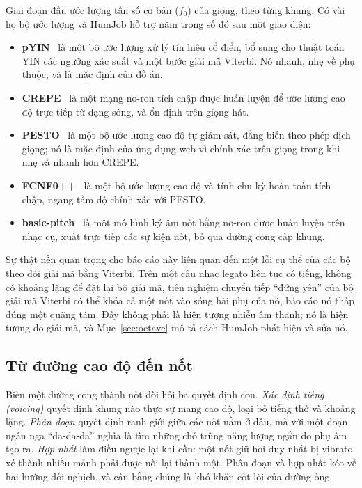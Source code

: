 \documentclass[12pt,a4paper]{article}
\begin{document}
Giai đoạn đầu ước lượng tần số cơ bản ($f_0$) của giọng, theo từng khung. Có vài họ
bộ ước lượng và HumJob hỗ trợ năm trong số đó sau một giao diện:

\begin{itemize}
    \item \textbf{pYIN}~\cite{pyin} là một bộ ước lượng xử lý tín hiệu cổ điển, bổ
    sung cho thuật toán YIN các ngưỡng xác suất và một bước giải mã Viterbi. Nó
    nhanh, nhẹ về phụ thuộc, và là mặc định của đồ án.
    \item \textbf{CREPE}~\cite{crepe} là một mạng nơ-ron tích chập được huấn luyện
    để ước lượng cao độ trực tiếp từ dạng sóng, và ổn định trên giọng hát.
    \item \textbf{PESTO}~\cite{pesto} là một bộ ước lượng cao độ tự giám sát, đẳng
    biến theo phép dịch giọng; nó là mặc định của ứng dụng web vì chính xác trên
    giọng trong khi nhẹ và nhanh hơn CREPE.
    \item \textbf{FCNF0++}~\cite{penn} là một bộ ước lượng cao độ và tính chu kỳ
    hoàn toàn tích chập, ngang tầm độ chính xác với PESTO.
    \item \textbf{basic-pitch}~\cite{basicpitch} là một mô hình ký âm nốt bằng
    nơ-ron được huấn luyện trên nhạc cụ, xuất trực tiếp các sự kiện nốt, bỏ qua
    đường cong cấp khung.
\end{itemize}

Sự thật nền quan trọng cho báo cáo này liên quan đến một lỗi cụ thể của các bộ theo
dõi giải mã bằng Viterbi. Trên một câu nhạc legato liên tục có tiếng, không có
khoảng lặng để đặt lại bộ giải mã, tiên nghiệm chuyển tiếp ``đứng yên'' của bộ giải
mã Viterbi có thể khóa cả một nốt vào sóng hài phụ của nó, báo cáo nó thấp đúng một
quãng tám. Đây không phải là hiện tượng nhiễu âm thanh; nó là hiện tượng do giải mã,
và Mục~\ref{sec:octave} mô tả cách HumJob phát hiện và sửa nó.

\subsection{Từ đường cao độ đến nốt}

Biến một đường cong thành nốt đòi hỏi ba quyết định con. \emph{Xác định tiếng
(voicing)} quyết định khung nào thực sự mang cao độ, loại bỏ tiếng thở và khoảng
lặng. \emph{Phân đoạn} quyết định ranh giới giữa các nốt nằm ở đâu, mà với một đoạn
ngân nga ``da-da-da'' nghĩa là tìm những chỗ trũng năng lượng ngắn do phụ âm tạo
ra. \emph{Hợp nhất} làm điều ngược lại khi cần: một nốt giữ hơi duy nhất bị vibrato
xé thành nhiều mảnh phải được nối lại thành một. Phân đoạn và hợp nhất kéo về hai
hướng đối nghịch, và cân bằng chúng là khó khăn cốt lõi của đường ống.
\end{document}
